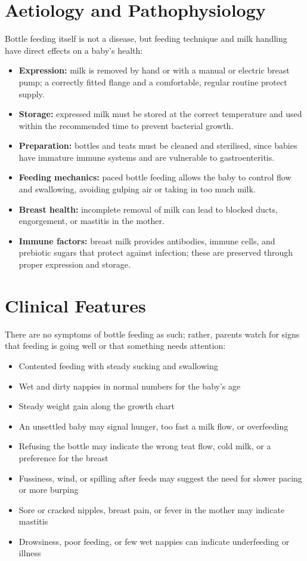 \section*{Aetiology and Pathophysiology}
Bottle feeding itself is not a disease, but feeding technique and milk handling have direct effects on a baby's health:
\begin{itemize}
    \item \textbf{Expression:} milk is removed by hand or with a manual or electric breast pump; a correctly fitted flange and a comfortable, regular routine protect supply.
    \item \textbf{Storage:} expressed milk must be stored at the correct temperature and used within the recommended time to prevent bacterial growth.
    \item \textbf{Preparation:} bottles and teats must be cleaned and sterilised, since babies have immature immune systems and are vulnerable to gastroenteritis.
    \item \textbf{Feeding mechanics:} paced bottle feeding allows the baby to control flow and swallowing, avoiding gulping air or taking in too much milk.
    \item \textbf{Breast health:} incomplete removal of milk can lead to blocked ducts, engorgement, or mastitis in the mother.
    \item \textbf{Immune factors:} breast milk provides antibodies, immune cells, and prebiotic sugars that protect against infection; these are preserved through proper expression and storage.
\end{itemize}

\section*{Clinical Features}
There are no symptoms of bottle feeding as such; rather, parents watch for signs that feeding is going well or that something needs attention:
\begin{itemize}
    \item Contented feeding with steady sucking and swallowing
    \item Wet and dirty nappies in normal numbers for the baby's age
    \item Steady weight gain along the growth chart
    \item An unsettled baby may signal hunger, too fast a milk flow, or overfeeding
    \item Refusing the bottle may indicate the wrong teat flow, cold milk, or a preference for the breast
    \item Fussiness, wind, or spilling after feeds may suggest the need for slower pacing or more burping
    \item Sore or cracked nipples, breast pain, or fever in the mother may indicate mastitis
    \item Drowsiness, poor feeding, or few wet nappies can indicate underfeeding or illness
\end{itemize}

